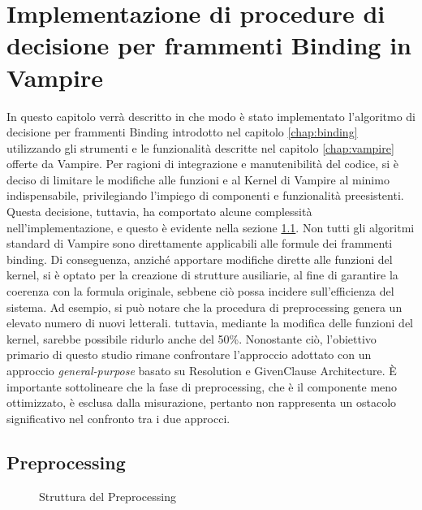 \documentclass[./main.tex]{subfiles}
\begin{document}
\newcommand{\ob}{\textit{1B} }
\newcommand{\fb}{$\forall$\textit{1B} }
\newcommand{\cb}{\textit{CB} }
\newcommand{\dbb}{\textit{DB} }

\chapter{Implementazione di procedure di decisione per frammenti Binding in Vampire} \label{chap:progettazione}
In questo capitolo verrà descritto in che modo è stato implementato l'algoritmo di decisione per frammenti Binding 
introdotto nel capitolo \ref{chap:binding} utilizzando gli strumenti 
e le funzionalità descritte nel capitolo \ref{chap:vampire} offerte da Vampire.
Per ragioni di integrazione e manutenibilità del codice,
si è deciso di limitare le modifiche alle funzioni e al Kernel di Vampire al minimo indispensabile, 
privilegiando l'impiego di componenti e funzionalità preesistenti. 
Questa decisione, tuttavia, ha comportato alcune complessità nell'implementazione, 
e questo è evidente nella sezione \ref{sec:preprocessing}. 
Non tutti gli algoritmi standard di Vampire sono direttamente applicabili alle formule dei frammenti binding. 
Di conseguenza, anziché apportare modifiche dirette alle funzioni del kernel, 
si è optato per la creazione di strutture ausiliarie, al fine di garantire la coerenza con la formula originale,
sebbene ciò possa incidere sull'efficienza del sistema. 
Ad esempio, si può notare che la procedura di preprocessing genera un elevato numero di nuovi letterali. 
tuttavia, mediante la modifica delle funzioni del kernel, sarebbe possibile ridurlo anche del 50\%.
Nonostante ciò, l'obiettivo primario di questo studio rimane confrontare l'approccio adottato con un approccio
\textit{general-purpose} basato su Resolution e GivenClause Architecture. 
È importante sottolineare che la fase di preprocessing, che è il componente meno ottimizzato,
è esclusa dalla misurazione, 
pertanto non rappresenta un ostacolo significativo nel confronto tra i due approcci.



\section{Preprocessing} \label{sec:preprocessing}

\begin{figure}[H]
    \centering
    \scalebox{0.55}{
        
    }
    \caption{Struttura del Preprocessing}
    \label{fig:preprocessing}
\end{figure}
\end{document}
